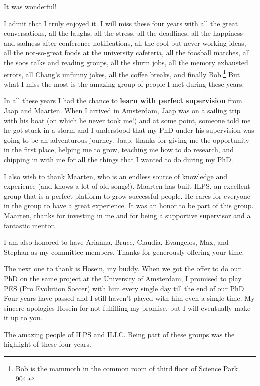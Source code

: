 \acknowledgments

It was wonderful! 

I admit that I truly enjoyed it. I will miss these four years with all the great conversations, all the laughs, all the stress, all the deadlines, all the happiness and sadness after conference notifications,  all the cool but never working ideas, all the not-so-great foods at the university cafeteria, all the foosball matches, all the soos talks and reading groups, all the slurm jobs, all the memory exhausted errors, all Chang's unfunny jokes, all the coffee breaks, and finally Bob.\footnote{Bob is the mammoth in the common room of third floor of Science Park 904.} But what I miss the most is the amazing group of people I met during these years.

In all these years I had the chance to \textbf{learn with perfect supervision} from Jaap and Maarten. 
When I arrived in Amsterdam, Jaap was on a sailing trip with his boat (on which he never took me!) and at some point, someone told me he got stuck in a storm and I understood that my PhD under his supervision was going to be an adventurous journey. Jaap, thanks for giving me the opportunity in the first place, helping me to grow, teaching me how to do research, and chipping in with me for all the things that I wanted to do during my PhD. 

I also wish to thank Maarten, who is an endless source of knowledge and experience (and knows a lot of old songs!). Maarten has built ILPS,  an excellent group that is a perfect platform to grow successful people. He cares for everyone in the group to have a great experience. It was an honor to be part of this group. Maarten, thanks for investing in me and for being a supportive supervisor and a fantastic mentor. 

I am also honored to have Arianna, Bruce, Claudia, Evangelos, Max, and Stephan as my committee members. Thanks for generously offering your time.

The next one to thank is Hosein, my buddy. When we got the offer to do our PhD on the same project at the University of Amsterdam, I promised to play PES (Pro Evolution Soccer) with him every single day till the end of our PhD. Four years have passed and I still haven't played with him even a single time. My sincere apologies Hosein for not fulfilling my promise, but I will eventually make it up to you.

The amazing people of ILPS and ILLC. Being part of these groups was the highlight of these four years. 

